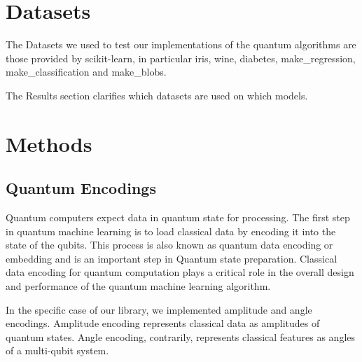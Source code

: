\documentclass{article}
\begin{document}
\begin{multicols}{2}
\section{Datasets}
The Datasets we used to test our implementations of the quantum algorithms are those provided by scikit-learn\cite{sklearn_api}, in particular iris, wine, diabetes,  make\_regression, make\_classification and make\_blobs.


The Results section clarifies which datasets are used on which models.
\section{Methods}
\subsection{Quantum Encodings}
Quantum computers expect data in quantum state for processing. The first step in quantum machine learning is to load classical data by encoding it into the state of the qubits. This process is also known as quantum data encoding \cite{data_encoding} or embedding and is an important step in Quantum state preparation. Classical data encoding for quantum computation plays a critical role in the overall design and performance of the quantum machine learning algorithm. 


In the specific case of our library, we implemented amplitude and angle encodings.
Amplitude encoding represents classical data as amplitudes of quantum states.
Angle encoding, contrarily, represents classical features as angles of a multi-qubit system.


\end{multicols}
\end{document}
